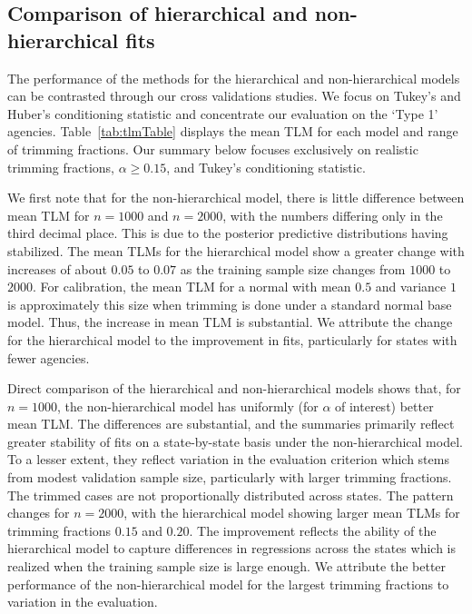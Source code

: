 \documentclass[12pt]{article}
\begin{document}
\subsection{Comparison of hierarchical and non-hierarchical fits}

The performance of the methods for the hierarchical and non-hierarchical models can be contrasted through our cross validations studies.  We focus on Tukey's and Huber's conditioning statistic and concentrate our evaluation on the `Type 1' agencies. Table~\ref{tab:tlmTable} displays the mean TLM for each model and range of trimming fractions.  Our summary below focuses exclusively on realistic trimming fractions, $\alpha \geq 0.15$, and Tukey's conditioning statistic.  

We first note that for the non-hierarchical model, there is little difference between mean TLM for $n=1000$ and $n=2000$, with 
the numbers differing only in the third decimal place.  This is due to the posterior predictive distributions having stabilized.  The
mean TLMs for the hierarchical model show a greater change with increases of about $0.05$ to $0.07$ as the training sample size changes
from $1000$ to $2000$.  For calibration, the mean TLM for a normal with mean $0.5$ and variance $1$ is approximately this size
when trimming is done under a standard normal base model.  Thus, the increase in mean TLM is substantial.  
We attribute the change for the hierarchical model to the 
improvement in fits, particularly for states with fewer agencies.  

Direct comparison of the hierarchical and non-hierarchical models shows that, for $n=1000$, the non-hierarchical model has uniformly 
(for $\alpha$ of interest) better mean TLM.  The differences are substantial, and the summaries primarily reflect greater stability of fits on a state-by-state basis under the non-hierarchical model.  To a lesser extent, they reflect variation in the evaluation criterion which stems from modest validation sample size, particularly with larger trimming fractions.  The trimmed cases are not proportionally distributed across states.  The pattern changes for $n=2000$, with the hierarchical model showing larger mean TLMs for trimming fractions $0.15$ and $0.20$.  The improvement reflects the ability of the hierarchical model to capture differences in regressions across the states which is realized when the training sample size is large enough.  We attribute the better performance of the non-hierarchical model for the largest trimming fractions to variation in the evaluation.  
\end{document}

